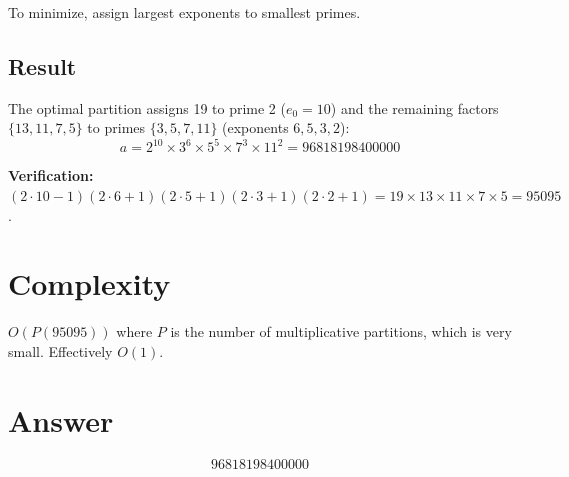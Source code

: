 \documentclass[12pt]{article}
\begin{document}
To minimize, assign largest exponents to smallest primes.

\subsection{Result}

The optimal partition assigns 19 to prime 2 ($e_0 = 10$) and the remaining factors $\{13, 11, 7, 5\}$ to primes $\{3, 5, 7, 11\}$ (exponents $6, 5, 3, 2$):
\[
a = 2^{10} \times 3^6 \times 5^5 \times 7^3 \times 11^2 = \boxed{96818198400000}
\]

\textbf{Verification:} $(2 \cdot 10 - 1)(2 \cdot 6 + 1)(2 \cdot 5 + 1)(2 \cdot 3 + 1)(2 \cdot 2 + 1) = 19 \times 13 \times 11 \times 7 \times 5 = 95095$.

\section{Complexity}
$O(P(95095))$ where $P$ is the number of multiplicative partitions, which is very small. Effectively $O(1)$.

\section{Answer}

\[
\boxed{96818198400000}
\]
\end{document}

